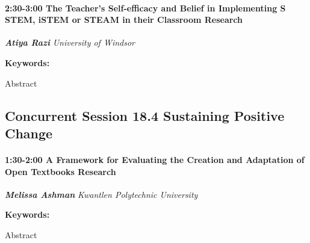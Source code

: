 \documentclass[
]{book}
\begin{document}
\begin{session}
\hypertarget{the-teachers-self-efficacy-and-belief-in-implementing-s-stem-istem-or-steam-in-their-classroom-research}{%
\paragraph*{\texorpdfstring{2:30-3:00 \textbar{} \textbf{The Teacher's
Self-efficacy and Belief in Implementing S STEM, iSTEM or STEAM in their
Classroom} \textbar{}
Research}{2:30-3:00 \textbar{} The Teacher's Self-efficacy and Belief in Implementing S STEM, iSTEM or STEAM in their Classroom \textbar{} Research}}\label{the-teachers-self-efficacy-and-belief-in-implementing-s-stem-istem-or-steam-in-their-classroom-research}}

\textbf{\emph{Atiya Razi}} \textbar{} \emph{University of Windsor}

\textbf{Keywords:}

Abstract
\end{session}

\hypertarget{concurrent-session-18.4-sustaining-positive-change}{%
\subsection*{Concurrent Session 18.4 \textbar{} Sustaining Positive Change}\label{concurrent-session-18.4-sustaining-positive-change}}

\begin{session}
\hypertarget{a-framework-for-evaluating-the-creation-and-adaptation-of-open-textbooks-research}{%
\paragraph*{\texorpdfstring{1:30-2:00 \textbar{} \textbf{A Framework for
Evaluating the Creation and Adaptation of Open Textbooks} \textbar{}
Research}{1:30-2:00 \textbar{} A Framework for Evaluating the Creation and Adaptation of Open Textbooks \textbar{} Research}}\label{a-framework-for-evaluating-the-creation-and-adaptation-of-open-textbooks-research}}

\textbf{\emph{Melissa Ashman}} \textbar{} \emph{Kwantlen Polytechnic
University}

\textbf{Keywords:}

Abstract
\end{session}
\end{document}
